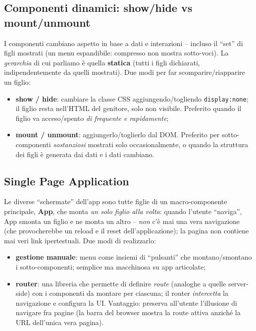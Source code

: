 \subsection{Componenti dinamici: show/hide vs mount/unmount}
I componenti cambiano aspetto in base a dati e interazioni -- incluso il ``set'' di figli
mostrati (un menu espandibile: compresso non mostra sotto-voci). La \emph{gerarchia} di cui
parliamo \`e quella \textbf{statica} (tutti i figli dichiarati, indipendentemente da quelli
mostrati). Due modi per far scomparire/riapparire un figlio:
\begin{itemize}
  \item \textbf{show / hide}: cambiare la classe CSS aggiungendo/togliendo
        \texttt{display:none}; il figlio resta nell'HTML del genitore, solo non visibile.
        Preferito quando il figlio va acceso/spento \emph{di frequente e rapidamente};
  \item \textbf{mount / unmount}: aggiungerlo/toglierlo dal DOM. Preferito per
        sotto-componenti \emph{sostanziosi} mostrati solo occasionalmente, o quando la
        struttura dei figli \`e generata dai dati e i dati cambiano.
\end{itemize}

\subsection{Single Page Application}
Le diverse ``schermate'' dell'app sono tutte figlie di un macro-componente principale,
\textbf{App}, che monta \emph{un solo figlio alla volta}: quando l'utente ``naviga'', App
smonta un figlio e ne monta un altro -- \emph{non} c'\`e mai una vera navigazione (che
provocherebbe un reload e il reset dell'applicazione); la pagina non contiene mai veri link
ipertestuali. Due modi di realizzarlo:
\begin{itemize}
  \item \textbf{gestione manuale}: menu come insiemi di ``pulsanti'' che montano/smontano i
        sotto-componenti; semplice ma macchinosa su app articolate;
  \item \textbf{router}: una libreria che permette di definire \emph{route} (analoghe a
        quelle server-side) con i componenti da montare per ciascuna; il router
        \emph{intercetta} la navigazione e configura la UI. Vantaggio: preserva all'utente
        l'illusione di navigare fra pagine (la barra del browser mostra la route attiva
        anzich\'e la URL dell'unica vera pagina).
\end{itemize}

